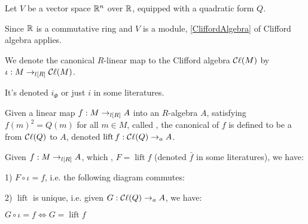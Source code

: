 \begin{example}
  \label{ex:clifford_algebra_v}

  Let $V$ be a vector space $\mathbb R^n$ over $\mathbb R$, equipped with a quadratic form $Q$.
  
  Since $\mathbb R$ is a commutative ring and $V$ is a module, \cref{CliffordAlgebra} of Clifford algebra applies.
\end{example}

\begin{definition}
  \label{iota}
  \leanok

  We denote the canonical $R$-linear map to the Clifford algebra $\mathop{\mathcal{C}\ell}(M)$ by $\iota : M \to_{l[R]} \mathop{\mathcal{C}\ell}(M)$.

  It's denoted $i_\Phi$ or just $i$ in some literatures.

\end{definition}

\begin{definition}
  \label{lift}
  \leanok

  Given a linear map $f : M \to_{l[R]} A$ into an $R$-algebra $A$,
  satisfying $f(m)^2 = Q(m)$ for all $m \in M$,
  called ,
  the canonical  of $f$ is defined to be a  from $\mathop{\mathcal{C}\ell}(Q)$ to $A$,
  denoted $\operatorname{lift} f : \mathop{\mathcal{C}\ell}(Q) \to_{a} A$.

\end{definition}

\begin{theorem}
  \label{univ}
  \leanok

  Given $f : M \to_{l[R]} A$, which , $F = \operatorname{lift} f$ (denoted $\bar{f}$ in some literatures), we have:

  1) $F \circ \iota = f$, i.e. the following diagram commutes:

  \begin{figure}[H]
    \centering
  \end{figure}

  2) $\operatorname{lift}$ is unique, i.e. given $G : \mathop{\mathcal{C}\ell}(Q) \to_{a} A$, we have:

  $ G \circ \iota = f \iff G = \operatorname{lift} f$

\end{theorem}

